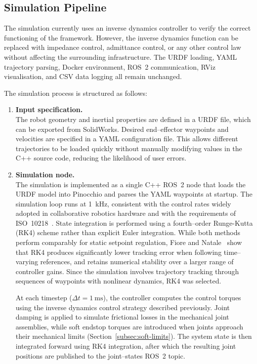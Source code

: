 \documentclass[11pt,a4paper,twoside,openright]{book}
\begin{document}
\subsection{Simulation Pipeline}\label{subsec:sim-pipeline}

The simulation currently uses an inverse dynamics controller to verify the correct functioning of the framework. However, the inverse dynamics function can be replaced with impedance control, admittance control, or any other control law without affecting the surrounding infrastructure. The URDF loading, YAML trajectory parsing, Docker environment, ROS~2 communication, RViz visualisation, and CSV data logging all remain unchanged.

The simulation process is structured as follows:

\begin{enumerate}
    \item \textbf{Input specification.} \\
    The robot geometry and inertial properties are defined in a URDF file, which can be exported from SolidWorks. Desired end--effector waypoints and velocities are specified in a YAML configuration file. This allows different trajectories to be loaded quickly without manually modifying values in the C++ source code, reducing the likelihood of user errors.

    \item \textbf{Simulation node.} \\
    The simulation is implemented as a single C++ ROS~2 node that loads the URDF model into Pinocchio and parses the YAML waypoints at startup. The simulation loop runs at \SI{1}{\kilo\hertz}, consistent with the control rates widely adopted in collaborative robotics hardware and with the requirements of ISO~10218~\cite{skerljBridgingSimtoRealGap2026}. State integration is performed using a fourth--order Runge-Kutta (RK4) scheme rather than explicit Euler integration. While both methods perform comparably for static setpoint regulation, Fiore and Natale~\cite{fioreDiscretetimeClosedloopInverse2021} show that RK4 produces significantly lower tracking error when following time--varying references, and retains numerical stability over a larger range of controller gains. Since the simulation involves trajectory tracking through sequences of waypoints with nonlinear dynamics, RK4 was selected.

At each timestep ($\Delta t = \SI{1}{\milli\second}$), the controller computes the control torques using the inverse dynamics control strategy described previously. Joint damping is applied to simulate frictional losses in the mechanical joint assemblies, while soft endstop torques are introduced when joints approach their mechanical limits (Section~\ref{subsec:soft-limits}). The system state is then integrated forward using RK4 integration, after which the resulting joint positions are published to the joint--states ROS~2 topic.
    

\end{enumerate}
\end{document}
